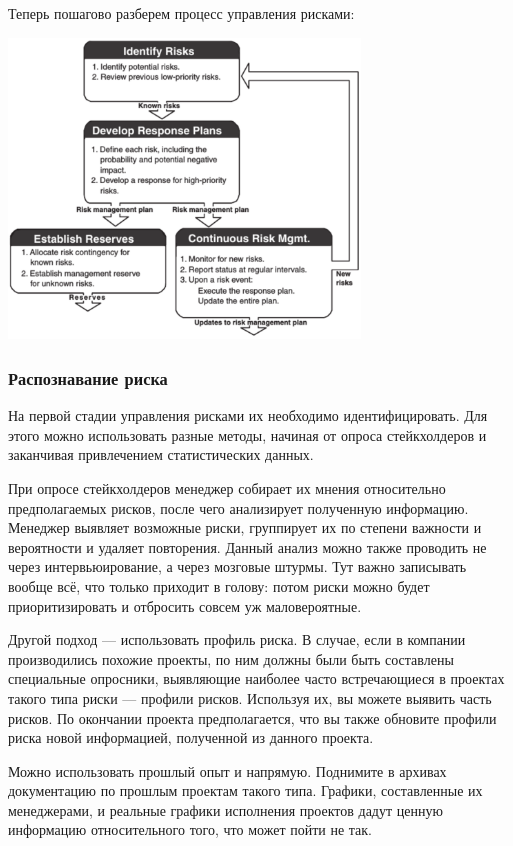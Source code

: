\documentclass{../../text-style}
\begin{document}
Теперь пошагово разберем процесс управления рисками:

\begin{center}
    \includegraphics[width=0.7\textwidth]{riskManagementLoop.png}
\end{center}

\subsubsection{Распознавание риска}

На первой стадии управления рисками их необходимо идентифицировать. Для этого можно использовать разные методы, начиная от опроса стейкхолдеров и заканчивая привлечением статистических данных.

При опросе стейкхолдеров менеджер собирает их мнения относительно предполагаемых рисков, после чего анализирует полученную информацию. Менеджер выявляет возможные риски, группирует их по степени важности и вероятности и удаляет повторения. Данный анализ можно также проводить не через интервьюирование, а через мозговые штурмы. Тут важно записывать вообще всё, что только приходит в голову: потом риски можно будет приоритизировать и отбросить совсем уж маловероятные.

Другой подход --- использовать профиль риска. В случае, если в компании производились похожие проекты, по ним должны были быть составлены специальные опросники, выявляющие наиболее часто встречающиеся в проектах такого типа риски --- профили рисков. Используя их, вы можете выявить часть рисков. По окончании проекта предполагается, что вы также обновите профили риска новой информацией, полученной из данного проекта.

Можно использовать прошлый опыт и напрямую. Поднимите в архивах документацию по прошлым проектам такого типа. Графики, составленные их менеджерами, и реальные графики исполнения проектов дадут ценную информацию относительного того, что может пойти не так.
\end{document}
